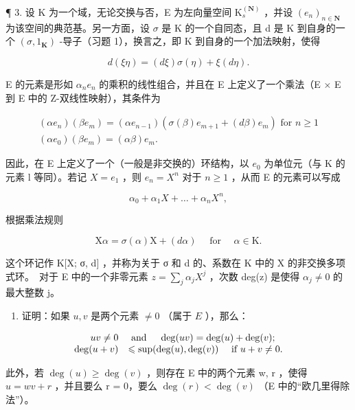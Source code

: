 ¶ 3. 设 K 为一个域，无论交换与否，E 为左向量空间 \(\mathrm{K}_{s}^{(\mathbf{N})}\) ，并设 \((e_{n})_{n\in\mathbf{N}}\) 为该空间的典范基。另一方面，设 \(\sigma\) 是 K 的一个自同态，且 d 是 K 到自身的一个 \((\sigma,1_{\mathbf{K}})\) -导子（习题 1），换言之，即 K 到自身的一个加法映射，使得

\[
d (\xi \eta) = (d \xi) \sigma (\eta) + \xi (d \eta).
\]

E 的元素是形如 \(\alpha_{n}e_{n}\) 的乘积的线性组合，并且在 E 上定义了一个乘法（E × E 到 E 中的 Z-双线性映射），其条件为

\[
\begin{array}{l} (\alpha e _ {n}) (\beta e _ {m}) = (\alpha e _ {n - 1}) (\sigma (\beta) e _ {m + 1} + (d \beta) e _ {m}) \text { for } n \geqslant 1 \\ (\alpha e _ {0}) (\beta e _ {m}) = (\alpha \beta) e _ {m}. \end{array}
\]

因此，在 E 上定义了一个（一般是非交换的）环结构，以 \(e_{0}\) 为单位元（与 K 的元素 l 等同）。若记 \(X = e_{1}\) ，则 \(e_{n} = X^{n}\) 对于 \(n \geqslant 1\) ，从而 E 的元素可以写成

\[
\alpha_ {0} + \alpha_ {1} X + \dots + \alpha_ {n} X ^ {n},
\]

根据乘法规则

\[
\mathrm{X} \alpha = \sigma (\alpha) \mathrm{X} + (d \alpha) \quad \text { for } \quad \alpha \in \mathrm{K}.
\]

这个环记作 K{[}X; σ, d{]} ，并称为关于 σ 和 d 的、系数在 K 中的 X 的非交换多项式环。~对于 E 中的一个非零元素 \(z = \sum_{j} \alpha_{j} X^{j}\) ，次数 deg(z) 是使得 \(\alpha_{j} \neq 0\) 的最大整数 j。

\begin{enumerate}
\def\labelenumi{(\alph{enumi})}
\tightlist
\item
  证明：如果 \(u, v\) 是两个元素 \(\neq 0\) （属于 \(E\) ），那么：
\end{enumerate}

\[
\begin{array}{r l} u v \neq 0 & \text { and } \quad \deg (u v) = \deg (u) + \deg (v); \\ \deg (u + v) & \leqslant \sup (\deg (u), \deg (v)) \quad \text { if } u + v \neq 0. \end{array}
\]

此外，若 \(\deg(u) \geqslant \deg(v)\) ，则存在 E 中的两个元素 w, r ，使得 \(u = wv + r\) ，并且要么 r = 0，要么 \(\deg(r) < \deg(v)\) （E 中的“欧几里得除法”）。

